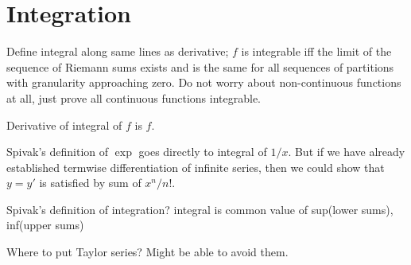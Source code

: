 \section{Integration}
Define integral along same lines as derivative; $f$ is integrable iff the limit of the sequence of Riemann sums exists and is the same for all sequences of partitions with granularity approaching zero. Do not worry about non-continuous functions at all, just prove all continuous functions integrable.

Derivative of integral of $f$ is $f$.

Spivak's definition of $\exp$ goes directly to integral of $1/x$. But if we have already established termwise differentiation of infinite series, then we could show that $y=y'$ is satisfied by sum of $x^n/n!$.

Spivak's definition of integration? integral is common value of sup(lower sums), inf(upper sums)

 Where to put Taylor series? Might be able to avoid them.